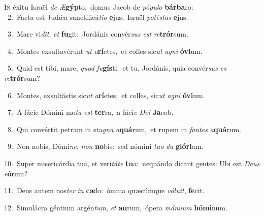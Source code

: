 \lettrine{\initial\textcolor{\initialcolor}{I}}{n} éxitu Israël \textit{de} \textit{Æ}\-\textbf{gýp}to,~\star domus Jacob de \textit{pó}\-\textit{pu}\textit{lo} \textbf{bár}\-\textbf{ba}ro:\\
{\numbfont\textcolor{\numbcolor}{~2.}}~Facta est Judǽa sanctificá\-\textit{ti}\-\textit{o} \textbf{e}\-jus,~\star Israël \textit{pot}\-\textit{és}\textit{tas} \textbf{e}\-jus.\par
{\numbfont\textcolor{\numbcolor}{~3.}}~Mare vi\-\textit{dit}\-, \textit{et} \textbf{fu}\-git:~\star Jordánis convér\textit{sus} \textit{est} \textit{re}\-\textbf{trór}sum.\par
{\numbfont\textcolor{\numbcolor}{~4.}}~Montes exsultavérunt \textit{ut} \textit{a}\-\textbf{rí}etes,~\star et colles sic\textit{ut} \textit{a}\-\textit{gni} \textbf{ó}\-\textbf{vi}um.\par
{\numbfont\textcolor{\numbcolor}{~5.}}~Quid est tibi, mare, \textit{quod} \textit{fu}\-\textbf{gís}ti:~\star et tu, Jordánis, quia convér\textit{sus} \textit{es} \textit{re}\-\textbf{trór}sum?\par
{\numbfont\textcolor{\numbcolor}{~6.}}~Montes, exsultástis sic\textit{ut} \textit{a}\-\textbf{rí}etes,~\star et colles, sic\textit{ut} \textit{a}\-\textit{gni} \textbf{ó}\-\textbf{vi}um.\par
{\numbfont\textcolor{\numbcolor}{~7.}}~A fácie Dómini mo\textit{ta} \textit{est} \textbf{ter}\-ra,~\star a fáci\textit{e} \textit{De}\-\textit{i} \textbf{Ja}\-cob.\par
{\numbfont\textcolor{\numbcolor}{~8.}}~Qui convértit petram in sta\textit{gna} \textit{a}\-\textbf{quá}rum,~\star et rupem in \textit{fon}\-\textit{tes} \textit{a}\-\textbf{quá}rum.\par
{\numbfont\textcolor{\numbcolor}{~9.}}~Non nobis, Dómi\-\textit{ne}\-, \textit{non} \textbf{no}\-bis:~\star sed nómini \textit{tu}\-\textit{o} \textit{da} \textbf{gló}\-\textbf{ri}am.\par
{\numbfont\textcolor{\numbcolor}{10.}}~Super misericórdia tua, et veri\-\textit{tá}\-\textit{te} \textbf{tu}\-a:~\star nequándo dicant gentes: Ubi est \textit{De}\-\textit{us} \textit{e}\-\textbf{ó}rum?\par
{\numbfont\textcolor{\numbcolor}{11.}}~Deus autem nos\textit{ter} \textit{in} \textbf{cæ}\-lo:~\star ómnia quæcúmque \textit{vó}\-\textit{lu}\textit{it}, \textbf{fe}\-cit.\par
{\numbfont\textcolor{\numbcolor}{12.}}~Simulácra géntium argén\-\textit{tum}\-, \textit{et} \textbf{au}\-rum,~\star ópera \textit{má}\-\textit{nu}\textit{um} \textbf{hó}\-\textbf{mi}num.\par
